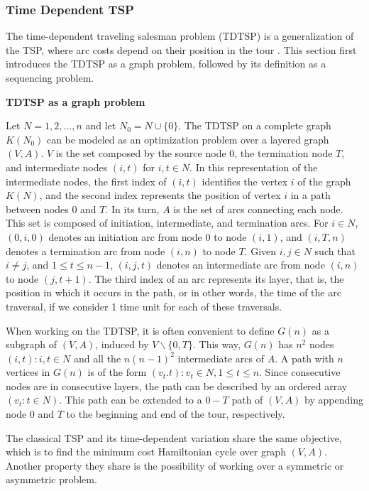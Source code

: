 \subsubsection{Time Dependent TSP}
\label{sec:time-dependent-tsp}

The time-dependent traveling salesman problem (TDTSP) is a generalization of the TSP, where arc costs depend on their position in the tour \cite{time_dependent_tsp, tdtsp_single_machine}. This section first introduces the TDTSP as a graph problem, followed by its definition as a sequencing problem. 

\textbf{TDTSP as a graph problem}

Let $N = {1, 2, ..., n}$ and let $N_{0} = N \cup \{0\}$. The TDTSP on a complete graph $K(N_{0})$ can be modeled as an optimization problem over a layered graph $(V, A)$. $V$ is the set composed by the source node $0$, the termination node $T$, and intermediate nodes $(i, t)$ for $i, t \in N$. In this representation of the intermediate nodes, the first index of $(i, t)$ identifies the vertex $i$ of the graph $K(N)$, and the second index represents the position of vertex $i$ in a path between nodes $0$ and $T$. In its turn, $A$ is the set of arcs connecting each node. This set is composed of initiation, intermediate, and termination arcs. For $i \in N$, $(0, i, 0)$ denotes an initiation arc from node 0 to node $(i, 1)$, and $(i, T, n)$ denotes a termination arc from node $(i, n)$ to node $T$. Given $i, j \in N$ such that $i \neq j$, and $1 \leq t \leq n-1$, $(i,j,t)$ denotes an intermediate arc from node $(i,n)$ to node $(j, t+1)$. The third index of an arc represents its layer, that is, the position in which it occurs in the path, or in other words, the time of the arc traversal, if we consider 1 time unit for each of these traversals.

When working on the TDTSP, it is often convenient to define $G(n)$ as a subgraph of $(V, A)$, induced by $V\backslash\{0, T\}$. %
This way, $G(n)$ has $n^2$ nodes ${(i, t): i, t \in N}$ and all the $n(n-1)^2$ intermediate arcs of $A$. A path with $n$ vertices in $G(n)$ is of the form ${(v_{t}. t): v_{t} \in N, 1 \leq t \leq n}$. Since consecutive nodes are in consecutive layers, the path can be described by an ordered array $(v_{t}: t \in N)$. This path can be extended to a $0-T$ path of $(V,A)$ by appending node $0$ and $T$ to the beginning and end of the tour, respectively.

The classical TSP and its time-dependent variation share the same objective, which is to find the minimum cost Hamiltonian cycle over graph $(V, A)$. Another property they share is the possibility of working over a symmetric or asymmetric problem.


